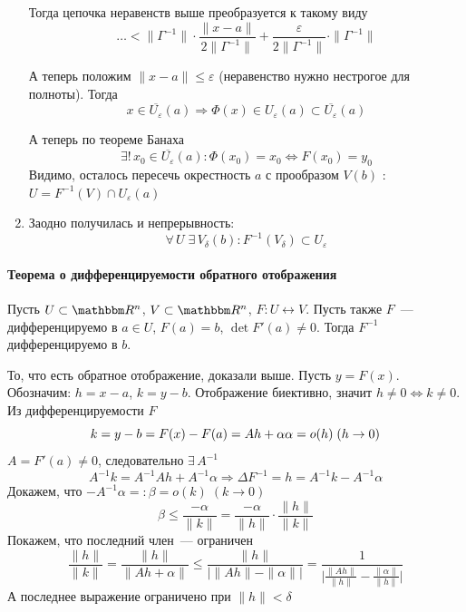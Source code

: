 \documentclass[12pt,timbord]{../../../notes}
\begin{document}
\begin{ittproof}
\begin{enumerate}
      Тогда цепочка неравенств выше преобразуется к такому виду
      \[
        \ldots < \|\Gamma^{-1}\| \cdot \frac{\|x - a\|}{2\|\Gamma^{-1}\|} +
        \frac{\varepsilon}{2\|\Gamma^{-1}\|} \cdot \|\Gamma^{-1}\|
      \]

      А теперь положим $\|x-a\| \leqslant \varepsilon$ (неравенство нужно нестрогое для полноты). 
      Тогда
      \[
        x\in \overline{U_\varepsilon}(a) \Rightarrow \Phi(x) \in U_{\varepsilon}(a) \subset 
        \overline{U_\varepsilon}(a) 
      \]

      А теперь по теореме Банаха
      \[
        \exists!\, x_0\in \overline{U_\varepsilon}(a) \colon \Phi(x_0) = x_0 \Leftrightarrow
        F(x_0)= y_0 
      \]
      Видимо, осталось пересечь окрестность $a$ с прообразом $V(b)$ : $U = F^{-1}(V) \cap
      U_\varepsilon (a)$
      \item
      Заодно получилась и непрерывность:
      \[
        \forall\, U\; \exists\, V_\delta(b) \colon F^{-1}(V_\delta) \subset
        U_\varepsilon 
      \]
  \end{enumerate}
\end{ittproof}

\paragraph{Теорема о дифференцируемости обратного отображения}
\label{par:diffspace::invdiff}

\begin{thrm}[о дифференцируемости $F^{-1}$]\label{thrm:diffspace::invdiff}
  Пусть $U \subset \R^n$, $V \subset \R^n$, $F\colon U \leftrightarrow V$. Пусть также
  $F$~--- дифференцируемо в $a\in U$, $F(a) = b$,  $\det F'(a) \neq 0$. 
  Тогда $F^{-1}$ дифференцируемо в $b$.
\end{thrm}
\begin{ittproof}
  То, что есть обратное отображение, доказали выше. Пусть $y=F(x)$. Обозначим: $h= x-a$, $k=y-b$.
  Отображение биективно, значит $h\neq 0 \Leftrightarrow k \neq 0$.
  Из дифференцируемости $F$
  \[
    k = y - b = F(x) - F(a) = A h + \alpha \\
    \alpha = o(h) \; (h\to 0)
  \]
  $A = F'(a) \neq 0$, следовательно $\exists\, A^{-1}$
  \[
    A^{-1} k = A^{-1}Ah + A^{-1}\alpha \Rightarrow \Delta F^{-1} = h = A^{-1} k - A^{-1} \alpha
  \]
  Докажем, что $-A^{-1} \alpha =: \beta = o(k) \; (k\to 0) $
  \[
    \beta \leqslant \frac{-\alpha}{\|k\|} = \frac{-\alpha}{\|h\|}\cdot \frac{\|h\|}{\|k\|}  
  \]
  Покажем, что последний член~--- ограничен
  \[
    \frac{\|h\|}{\|k\|} = \frac{\|h\|}{\|A h + \alpha\|} 
    \leqslant \frac{\|h\|}{\big|\|Ah\|- \|\alpha\|\big|}
    = \frac{1}{\big|\frac{\|Ah\|}{\|h\|} - \frac{\|\alpha\|}{\|h\|}\big|}  
  \]
  А последнее выражение ограничено при $\|h\| < \delta$

\end{ittproof}
\end{document}

